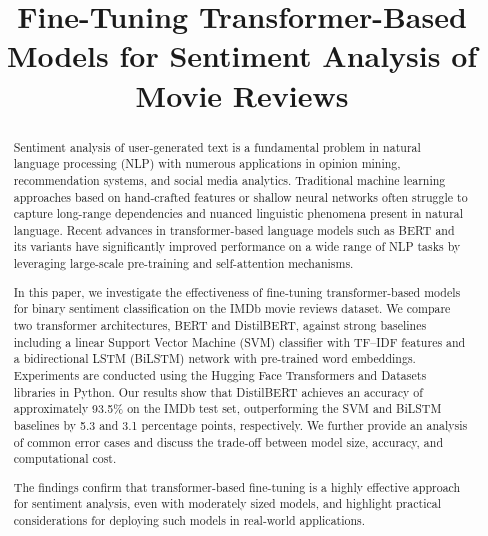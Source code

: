 \documentclass[conference]{IEEEtran}
\begin{document}
\title{Fine-Tuning Transformer-Based Models for Sentiment Analysis of Movie Reviews}

\author{
}

\maketitle

\begin{abstract}
Sentiment analysis of user-generated text is a fundamental problem in natural language processing (NLP) with numerous applications in opinion mining, recommendation systems, and social media analytics. Traditional machine learning approaches based on hand-crafted features or shallow neural networks often struggle to capture long-range dependencies and nuanced linguistic phenomena present in natural language. Recent advances in transformer-based language models such as BERT and its variants have significantly improved performance on a wide range of NLP tasks by leveraging large-scale pre-training and self-attention mechanisms.

In this paper, we investigate the effectiveness of fine-tuning transformer-based models for binary sentiment classification on the IMDb movie reviews dataset. We compare two transformer architectures, BERT and DistilBERT, against strong baselines including a linear Support Vector Machine (SVM) classifier with TF--IDF features and a bidirectional LSTM (BiLSTM) network with pre-trained word embeddings. Experiments are conducted using the Hugging Face Transformers and Datasets libraries in Python. Our results show that DistilBERT achieves an accuracy of approximately 93.5\% on the IMDb test set, outperforming the SVM and BiLSTM baselines by 5.3 and 3.1 percentage points, respectively. We further provide an analysis of common error cases and discuss the trade-off between model size, accuracy, and computational cost.

The findings confirm that transformer-based fine-tuning is a highly effective approach for sentiment analysis, even with moderately sized models, and highlight practical considerations for deploying such models in real-world applications.
\end{abstract}
\end{document}
